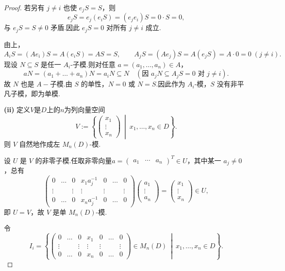 \begin{proof}
若另有 $j \neq i$ 也使 $e_j S = S$，则
\[
e_j S = e_j(e_i S) = (e_j e_i) S = 0 \cdot S = 0,
\]
与 $e_j S = S \neq 0$ 矛盾.因此 $e_j S = 0$ 对所有 $j \neq i$ 成立.\par
\noindent{} 由上，
\[
A_i S = (A e_i) S = A(e_i S) = A S = S, \qquad
A_j S = (A e_j) S = A(e_j S) = A \cdot 0 = 0 \;(j \neq i).
\]
现设 $N \subseteq S$ 是任一 $A_i$-子模.则对任意 $a = (a_1,\dots,a_n) \in A$，
\[
a N = (a_1 + \dots + a_n) N = a_i N \subseteq N \quad (\text{因 } a_j N \subseteq A_j S = 0 \text{ 对 } j \neq i).
\]
故 $N$ 也是 $A-\!\!$子模.由 $S$ 的单性，$N = 0$ 或 $N = S$.因此作为 $A_i$-模，$S$ 没有非平凡子模，即为单模.\par
\noindent \textbf{(ii)} 定义$V$是$D$上的$n$为列向量空间
$$
V := \left\{ \begin{pmatrix} x_1 \\ \vdots \\ x_n \end{pmatrix} \ \middle| \ x_1, \dots, x_n \in D \right\}.
$$
则 $V$ 自然地作成左 $M_n(D)$-模.\par
\noindent{} 设 $U$ 是 $V$ 的非零子模.任取非零向量$a = \begin{pmatrix} a_1 & \cdots & a_n \end{pmatrix}^T \in U$，其中某一 $a_j \neq 0$，总有
$$
\begin{pmatrix}
0 & \dots & 0 & x_1 a_j^{-1} & 0 & \dots & 0 \\
\vdots & & \vdots & \vdots & \vdots & & \vdots \\
0 & \dots & 0 & x_n a_j^{-1} & 0 & \dots & 0
\end{pmatrix}
\begin{pmatrix} a_1 \\ \vdots \\ a_n \end{pmatrix}
= \begin{pmatrix} x_1 \\ \vdots \\ x_n \end{pmatrix} \in U,
$$
即 $U = V$，故 $V$ 是单 $M_n(D)$-模.\par
\noindent{} 令
$$
I_i = \left\{ \begin{pmatrix}
0 & \dots & 0 & x_1 & 0 & \dots & 0 \\
\vdots & & \vdots & \vdots & \vdots & & \vdots \\
0 & \dots & 0 & x_n & 0 & \dots & 0
\end{pmatrix}
\in M_n(D) \ \middle| \ x_1, \dots, x_n \in D \right\}.
$$
\end{proof}
